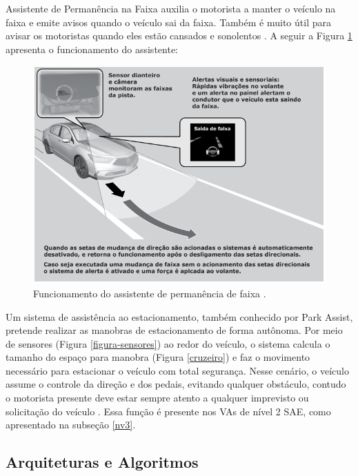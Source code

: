  \label{faixa}
Assistente de Permanência na Faixa auxilia o motorista a manter o veículo na faixa e emite avisos quando o veículo sai da faixa. Também é muito útil para avisar os motoristas quando eles estão cansados e sonolentos \cite{caio}. A seguir a Figura \ref{assistente} apresenta o funcionamento do assistente:
\begin{figure}[H]
\centering
\includegraphics[width=\textwidth]{Figures/assistente.png}
\caption{Funcionamento do assistente de permanência de faixa \cite{caio}.}
\label{assistente}
\end{figure}

 \label{estacionamento}
Um sistema de assistência ao estacionamento, também conhecido por Park Assist, pretende realizar as manobras de estacionamento de forma autônoma. Por meio de sensores (Figura \ref{figura-sensores}) ao redor do veículo, o sistema calcula o tamanho do espaço para manobra (Figura \ref{cruzeiro}) e faz o movimento necessário para estacionar o veículo com total segurança. Nesse cenário, o veículo assume o controle da direção e dos pedais, evitando qualquer obstáculo, contudo o motorista presente deve estar sempre atento a qualquer imprevisto ou solicitação do veículo \cite{caio}. Essa função é presente nos VAs de nível 2 SAE, como apresentado na subseção \ref{nv3}.
\subsection{Arquiteturas e Algoritmos} \label{arq_alg}

